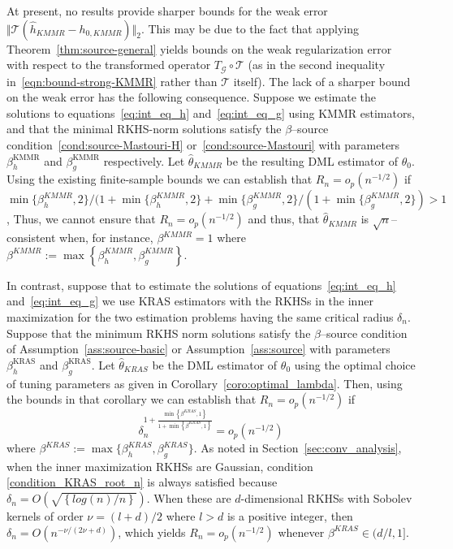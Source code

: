 \documentclass[twoside,11pt]{article}
\newcommand{\mc}{\mathcal}
\begin{document}
\begin{itemize}
At present, no results provide sharper bounds for the weak error $\Vert\mc{T}(\hat h_{KMMR}-h_{0,KMMR})\Vert_2$. This may be due to the fact that applying Theorem~\ref{thm:source-general} yields bounds on the weak regularization error with respect to the transformed operator $T_{\mc{G}} \circ \mc{T}$ (as in the second inequality in~\eqref{eqn:bound-strong-KMMR} rather than $\mc{T}$ itself). The lack of a sharper bound on the weak error has the following consequence. Suppose we estimate the solutions to equations~\eqref{eq:int_eq_h} and~\eqref{eq:int_eq_g} using KMMR estimators, and that the minimal RKHS-norm solutions satisfy the $\beta$--source condition~\eqref{cond:source-Mastouri-H} or~\eqref{cond:source-Mastouri} with parameters $\beta_h^{\text{KMMR}}$ and $\beta_g^{\text{KMMR}}$ respectively. Let $\hat{\theta}_{KMMR}$ be the resulting DML estimator of $\theta_0$. Using the existing finite-sample bounds we can establish that $R_n =o_p(n^{-1/2})$ if $\min\{\beta_h^{KMMR},2\}/(1+\min\{\beta_h^{KMMR},2\} + \min\{\beta_g^{KMMR},2\}/(1+\min\{\beta_g^{KMMR},2\}) > 1$, Thus, we cannot ensure that  $R_n =o_p(n^{-1/2})$ and thus, that $\hat{\theta}_{KMMR}$ is $\sqrt{n}$--consistent when, for instance, $\beta^{KMMR} =1$ where $
\beta^{KMMR}:= \max\left\{\beta_h^{KMMR},\beta_g^{KMMR}\right\}
$.

In contrast, suppose that to estimate the solutions of equations~\eqref{eq:int_eq_h} and~\eqref{eq:int_eq_g} we use KRAS estimators with the RKHSs in the inner maximization for the two estimation problems having the same critical radius $\delta_n$. Suppose that the minimum RKHS norm solutions satisfy the $\beta$--source condition of Assumption~\ref{ass:source-basic} or Assumption~\ref{ass:source} with parameters $\beta_h^{\text{KRAS}}$ and $\beta_g^{\text{KRAS}}$. Let $\hat{\theta}_{KRAS}$ be the DML estimator of $\theta_0$ using the optimal choice of tuning parameters as given in Corollary~\ref{coro:optimal_lambda}. Then, using the bounds in that corollary we can establish that $R_n =o_p(n^{-1/2})$ if 
\begin{equation}
\delta_n^{1+\frac{\min\left\{\beta^{KRAS},1\right\}}{1+\min\left\{\beta^{KRAS},1\right\}}}= o_p (n^{-1/2})
\label{condition_KRAS_root_n}
\end{equation} 
where $\beta^{KRAS}:=\max\{\beta_h^{KRAS},\beta_g^{KRAS}\}$. As noted in Section~\ref{sec:conv_analysis}, when the inner maximization RKHSs are Gaussian, condition \eqref{condition_KRAS_root_n} is always satisfied because $\delta_n = O(\sqrt{\left\{log(n)/n \right\}})$. When these are $d$-dimensional RKHSs with Sobolev kernels of order $\nu=(l+d)/2$ where $l>d$ is a positive integer, then $\delta_n = O(n^{-\nu/(2\nu+d)})$, which yields $R_n = o_p(n^{-1/2})$ whenever $\beta^{KRAS}\in(d/l,1]$.  


\end{itemize}
\end{document}
